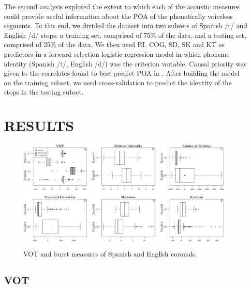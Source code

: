 \documentclass[a4paper,11pt,twocolumn]{article}
\begin{document}
The second analysis explored the extent to which each of the acoustic measures could provide useful information about the POA of the phonetically voiceless segments. To this end, we divided the dataset into two subsets of Spanish /t/ and English /d/ stops: a training set, comprised of 75\% of the data, and a testing set, comprised of 25\% of the data. We then used RI, COG, SD, SK and KT as predictors in a forward selection logistic regression model in which phoneme identity (Spanish /t/, English /d/) was the criterion variable. Causal priority was given to the correlates found to best predict POA in \cite{sundara2005acoustic}. After building the model on the training subset, we used cross-validation to predict the identity of the stops in the testing subset.


\section{RESULTS}

\begin{figure}[t!]
\caption{VOT and burst measures of Spanish and English coronals.\label{fig:all}}
\begin{center}
\includegraphics[width=.9\textwidth]{figures/prod.pdf}
\end{center}
\end{figure}

\subsection{VOT}
\end{document}
